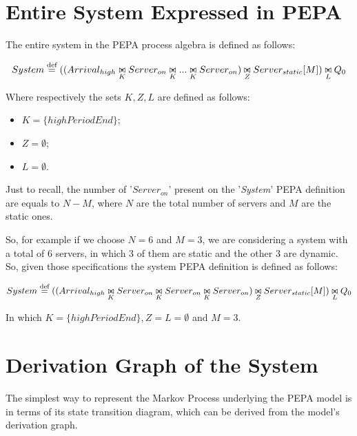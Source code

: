 \documentclass{article}
\newcommand*{\defeq}{\stackrel{\text{def}}{=}}
\newcommand{\newbowtie}{\mathrel{\ooalign{$\triangleright$\,\cr\,$\triangleleft$}}}
\begin{document}
\section{Entire System Expressed in PEPA}

The entire system in the PEPA process algebra is defined as follows:

\[System \defeq ((Arrival_{high} \underset{K}{\newbowtie}
 Server_{on} \underset{K}{\newbowtie} ... \underset{K}{\newbowtie} Server_{on}) \underset{Z}{\newbowtie} Server_{static}[M]) \underset{L}{\newbowtie} Q_{0}\]
 
\noindent Where respectively the sets \(K,Z,L\) are defined as follows:
 
\begin{itemize}
    \item \(K = \{highPeriodEnd\}\);
    \item \(Z = \emptyset \);
    \item \(L = \emptyset \).
\end{itemize}

\noindent Just to recall, the number of '\textit{\(Server_{on}\)}' present on the '\textit{System}' PEPA definition are equals to \(N - M\), where \(N\) are the total number of servers and \(M\) are the static ones.\newline

\par\noindent So, for example if we choose \(N = 6\) and \(M = 3\), we are considering a system with a total of 6 servers, in which 3 of them are static and the other 3 are dynamic.\newline
So, given those specifications the system PEPA definition is defined as follows:

\[System \defeq ((Arrival_{high} \underset{K}{\newbowtie}
 Server_{on} \underset{K}{\newbowtie} Server_{on} \underset{K}{\newbowtie}
 Server_{on}) \underset{Z}{\newbowtie} Server_{static}[M]) \underset{L}{\newbowtie} Q_{0}\]
 
\noindent In which \(K = \{highPeriodEnd\}, Z = L = \emptyset\) and \(M = 3\).

\section{Derivation Graph of the System}
\label{sec:derivation-graph-of-the-system}

The simplest way to represent the Markov Process underlying the PEPA model is in terms of its state transition diagram, which can be derived from the model's derivation graph.\newline
\end{document}
